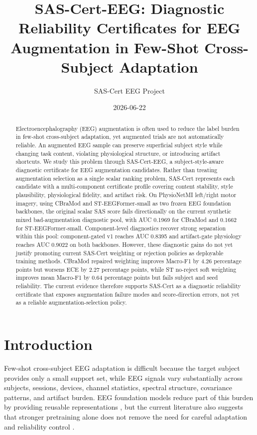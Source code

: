 \documentclass[11pt]{article}
\title{SAS-Cert-EEG: Diagnostic Reliability Certificates for EEG Augmentation in Few-Shot Cross-Subject Adaptation}
\author{SAS-Cert EEG Project}
\date{2026-06-22}
\begin{document}
\maketitle
\begin{abstract}

Electroencephalography (EEG) augmentation is often used to reduce the label burden in few-shot cross-subject adaptation, yet augmented trials are not automatically reliable. An augmented EEG sample can preserve superficial subject style while changing task content, violating physiological structure, or introducing artifact shortcuts. We study this problem through SAS-Cert-EEG, a subject-style-aware diagnostic certificate for EEG augmentation candidates. Rather than treating augmentation selection as a single scalar ranking problem, SAS-Cert represents each candidate with a multi-component certificate profile covering content stability, style plausibility, physiological fidelity, and artifact risk. On PhysioNetMI left/right motor imagery, using CBraMod and ST-EEGFormer-small as two frozen EEG foundation backbones, the original scalar SAS score fails directionally on the current synthetic mixed bad-augmentation diagnostic pool, with AUC 0.1969 for CBraMod and 0.1662 for ST-EEGFormer-small. Component-level diagnostics recover strong separation within this pool: component-gated v1 reaches AUC 0.8395 and artifact-gate physiology reaches AUC 0.9022 on both backbones. However, these diagnostic gains do not yet justify promoting current SAS-Cert weighting or rejection policies as deployable training methods. CBraMod repaired weighting improves Macro-F1 by 4.26 percentage points but worsens ECE by 2.27 percentage points, while ST no-reject soft weighting improves mean Macro-F1 by 0.64 percentage points but fails subject and seed reliability. The current evidence therefore supports SAS-Cert as a diagnostic reliability certificate that exposes augmentation failure modes and score-direction errors, not yet as a reliable augmentation-selection policy.

\end{abstract}
\section{Introduction}

Few-shot cross-subject EEG adaptation is difficult because the target subject provides only a small support set, while EEG signals vary substantially across subjects, sessions, devices, channel statistics, spectral structure, covariance patterns, and artifact burden. EEG foundation models reduce part of this burden by providing reusable representations \cite{Wang2025CBraMod,Lee2025LargeBrainwaveFoundation}, but the current literature also suggests that stronger pretraining alone does not remove the need for careful adaptation and reliability control \cite{Sirca2026LoRAEEG,Lee2025LargeBrainwaveFoundation}.
\end{document}
